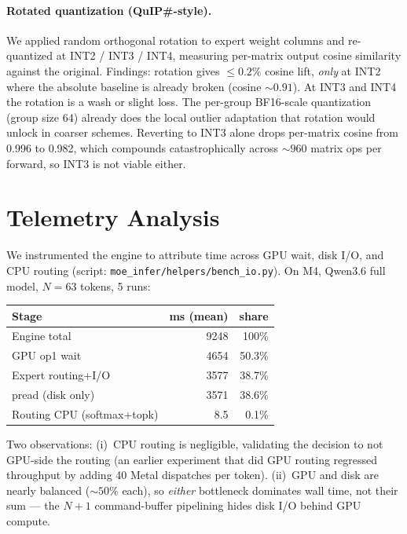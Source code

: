\documentclass[11pt,a4paper]{article}
\begin{document}
\paragraph{Rotated quantization (QuIP\#-style).} We applied random
orthogonal rotation to expert weight columns and re-quantized at INT2
/ INT3 / INT4, measuring per-matrix output cosine similarity against
the original. Findings: rotation gives $\leq 0.2\%$ cosine lift,
\emph{only} at INT2 where the absolute baseline is already broken
(cosine $\sim 0.91$). At INT3 and INT4 the rotation is a wash or
slight loss. The per-group BF16-scale quantization (group size 64)
already does the local outlier adaptation that rotation would unlock
in coarser schemes. Reverting to INT3 alone drops per-matrix cosine
from 0.996 to 0.982, which compounds catastrophically across $\sim 960$
matrix ops per forward, so INT3 is not viable either.

\section{Telemetry Analysis}\label{sec:telemetry}

We instrumented the engine to attribute time across GPU wait, disk
I/O, and CPU routing (script: \texttt{moe_infer/helpers/bench\_io.py}). On M4,
Qwen3.6 full model, $N{=}63$ tokens, 5 runs:

\begin{center}
\begin{tabular}{lrr}
\toprule
Stage & ms (mean) & share \\
\midrule
Engine total          & 9248 & 100\% \\
\quad GPU op1 wait    & 4654 & 50.3\% \\
\quad Expert routing+I/O & 3577 & 38.7\% \\
\qquad pread (disk only) & 3571 & 38.6\% \\
\quad Routing CPU (softmax+topk) & 8.5 & 0.1\% \\
\bottomrule
\end{tabular}
\end{center}

Two observations: (i)~CPU routing is negligible, validating the
decision to not GPU-side the routing (an earlier experiment that did
GPU routing regressed throughput by adding 40 Metal dispatches per
token). (ii)~GPU and disk are nearly balanced ($\sim 50\%$ each), so
\emph{either} bottleneck dominates wall time, not their sum --- the
$N{+}1$ command-buffer pipelining hides disk I/O behind GPU compute.
\end{document}
